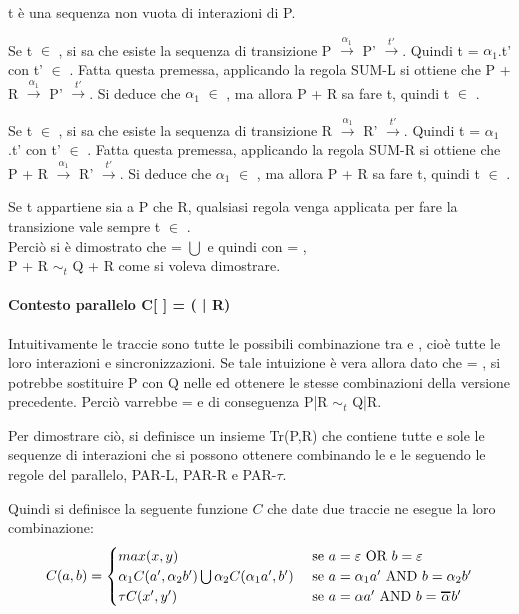 t è una sequenza non vuota di interazioni di P.

Se t $\in$ , si sa che esiste la sequenza di transizione P $\overset{\alpha_{1}}\rightarrow$ P' $\overset{t'}\rightarrow$. Quindi t = $\alpha_{1}$.t' con t' $\in$ . Fatta questa premessa, applicando la regola SUM-L si ottiene che P + R $\overset{\alpha_{1}}\rightarrow$ P' $\overset{t'}\rightarrow$. Si deduce che $\alpha_{1}$ $\in$ , ma allora P + R sa fare t, quindi t $\in$ .

Se t $\in$ , si sa che esiste la sequenza di transizione R $\overset{\alpha_{1}}\rightarrow$ R' $\overset{t'}\rightarrow$. Quindi t = $\alpha_{1}$.t' con t' $\in$ . Fatta questa premessa, applicando la regola SUM-R si ottiene che P + R $\overset{\alpha_{1}}\rightarrow$ R' $\overset{t'}\rightarrow$. Si deduce che $\alpha_{1}$ $\in$ , ma allora P + R sa fare t, quindi t $\in$ .

Se t appartiene sia a P che R, qualsiasi regola venga applicata per fare la transizione vale sempre t $\in$ .\\

Perciò si è dimostrato che  =  $\bigcup$  e quindi con  = ,\\ P + R $\sim_{t}$ Q + R come si voleva dimostrare.

\paragraph{Contesto parallelo  C[ ] = (\hspace{0.3cm} | R)} \mbox{}

Intuitivamente le traccie  sono tutte le possibili combinazione tra  e , cioè tutte le loro interazioni e sincronizzazioni. Se tale intuizione è vera allora dato che  = , si potrebbe sostituire P con Q nelle  ed ottenere le stesse combinazioni della versione precedente. Perciò varrebbe  =  e di conseguenza P|R $\sim_{t}$ Q|R.

Per dimostrare ciò, si definisce un insieme Tr(P,R) che contiene tutte e sole le sequenze di interazioni che si possono ottenere combinando le  e le  seguendo le regole del parallelo, PAR-L, PAR-R e PAR-$\tau$.

Quindi si definisce la seguente funzione $C$ che date due traccie ne esegue la loro combinazione:
\[
	C(a,b) = 
	\begin{cases}
	max(x,y) &  $ se $ a = \varepsilon $ OR $ b = \varepsilon\\
	\alpha_{1}C(a', \alpha_{2}b')\bigcup\alpha_{2}C(\alpha_{1}a', b') & $ se $ a = \alpha_{1}a' $ AND $ b = \alpha_{2}b'\\
	\tau C(x',y') & $ se $ a = \alpha a' $ AND $ b = \Overline[1pt]{\alpha} b'\\
	\end{cases}
\]

